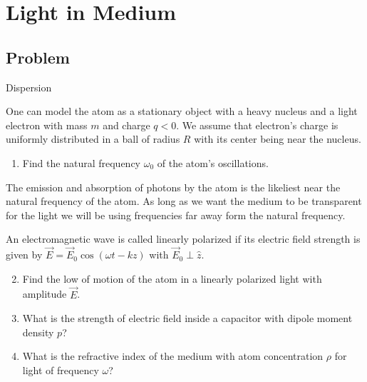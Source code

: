 \section*{Light in Medium}

\subsection*{Problem}

\renewcommand{\labelenumii}{\theenumii}
\renewcommand{\theenumii}{\theenumi.\arabic{enumii}.}

\begin{enumerate}

{\bfseries
\item Dispersion
}

One can model the atom as a stationary object with a heavy nucleus
and a light electron with mass $m$ and charge $q < 0$.
We assume that electron's charge is uniformly distributed
in a ball of radius $R$ with its center being near the nucleus.

\begin{enumerate}
    \item Find the natural frequency $\omega_0$ of the atom's oscillations.
\end{enumerate}

\hspace{.5cm}
The emission and absorption of photons by the atom
is the likeliest near the natural frequency of the atom.
As long as we want the medium to be transparent for the light
we will be using frequencies far away form the natural frequency.

\hspace{.5cm}
An electromagnetic wave is called linearly polarized
if its electric field strength is given by
$\vec{E} = \vec{E}_0 \cos(\omega t - k z)$ with $\vec{E}_0 \perp \hat{z}$.

\begin{enumerate}
    \setcounter{enumii}{1}
    \item Find the low of motion of the atom
    in a linearly polarized light with amplitude $\vec{E}$.

    \item What is the strength of electric field inside a capacitor
    with dipole moment density $p$?

    \item What is the refractive index of the medium
    with atom concentration $\rho$ for light of frequency $\omega$?
\end{enumerate}


\end{enumerate}

